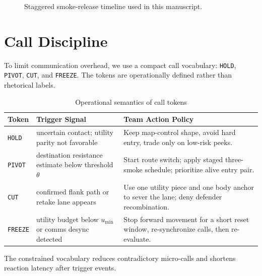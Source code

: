 \documentclass[runningheads]{llncs}
\begin{document}
\begin{figure}[t]
\centering
{}
\caption{Staggered smoke-release timeline used in this manuscript.}
\label{fig:timeline-en}
\end{figure}

\section{Call Discipline}
To limit communication overhead, we use a compact call vocabulary:
\texttt{HOLD}, \texttt{PIVOT}, \texttt{CUT}, and \texttt{FREEZE}. The tokens are operationally defined rather than rhetorical labels.
\begin{table}[t]
\centering
\caption{Operational semantics of call tokens}
\begin{tabular}{p{1.8cm}p{2.9cm}p{5.6cm}}
\toprule
Token & Trigger Signal & Team Action Policy \\
\midrule
\texttt{HOLD} & uncertain contact; utility parity not favorable & Keep map-control shape, avoid hard entry, trade only on low-risk peeks. \\
\texttt{PIVOT} & destination resistance estimate below threshold $\theta$ & Start route switch; apply staged three-smoke schedule; prioritize alive entry pair. \\
\texttt{CUT} & confirmed flank path or retake lane appears & Use one utility piece and one body anchor to sever the lane; deny defender recombination. \\
\texttt{FREEZE} & utility budget below $u_{\min}$ or comms desync detected & Stop forward movement for a short reset window, re-synchronize calls, then re-evaluate. \\
\bottomrule
\end{tabular}
\end{table}
The constrained vocabulary reduces contradictory micro-calls and shortens reaction latency after trigger events.
\end{document}
